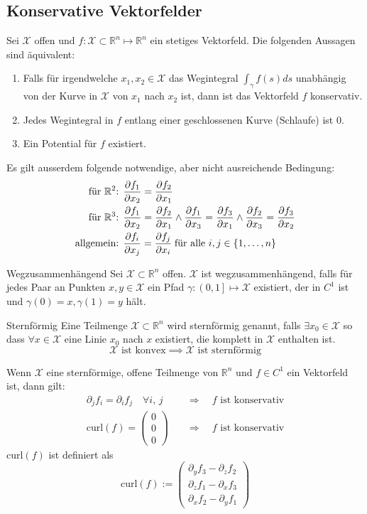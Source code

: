 \documentclass[a4paper,10pt]{article}
\def\R{\mathbb{R}}
\def\X{\mathcal{X}}
\begin{document}
\subsection{Konservative Vektorfelder}
Sei \(\X\) offen und \(f: \X \subset \R^n \mapsto \R^n\) ein stetiges Vektorfeld. Die folgenden Aussagen sind äquivalent:
\begin{enumerate}
  \item Falls für irgendwelche \(x_1, x_2 \in \X\) das Wegintegral \(\int_\gamma f(s) ds\) unabhängig von der Kurve in \(\X\) von \(x_1\) nach \(x_2\) ist, dann ist das Vektorfeld \(f\) konservativ.
  \item Jedes Wegintegral in \(f\) entlang einer geschlossenen Kurve (Schlaufe) ist 0.
  \item Ein Potential für \(f\) existiert.
\end{enumerate}
Es gilt ausserdem folgende notwendige, aber nicht ausreichende Bedingung:
\begin{align*}
  \text{für $\R^2$: }&\pdv{f_1}{x_2} = \pdv{f_2}{x_1}\\
  \text{für $\R^3$: }&\pdv{f_1}{x_2} = \pdv{f_2}{x_1} \land \pdv{f_1}{x_3} = \pdv{f_3}{x_1} \land \pdv{f_2}{x_3} = \pdv{f_3}{x_2}\\
  \text{allgemein: }&\pdv{f_i}{x_j} = \pdv{f_j}{x_i}\; \text{für alle $i,j \in \{1,\dots,n\}$}
\end{align*}
\begin{subbox}{Wegzusammenhängend}
  Sei \(\X \subset \R^n\) offen. \(\X\) ist wegzusammenhängend, falls für jedes Paar an Punkten \(x, y \in \X\) ein Pfad \(\gamma : \left(0,1\right] \mapsto \X\) existiert, der in \(C^1\) ist und \(\gamma(0) = x, \gamma(1) = y\) hält.
\end{subbox}

\begin{subbox}{Sternförmig}
  Eine Teilmenge \(\X \subset \R^n\) wird sternförmig genannt, falls \(\exists x_0 \in \X\) so dass \(\forall x \in \X\) eine Linie \(x_0\) nach \(x\) existiert, die komplett in \(\X\) enthalten ist. 
  \[\X \text{ ist konvex} \implies \X \text{ ist sternförmig}\]
\end{subbox}
Wenn \(\X\) eine sternförmige, offene Teilmenge von \(\R^n\) und \(f \in C^1\) ein Vektorfeld ist, dann gilt:
\begin{align*}
  \partial_j f_i = \partial_i f_j \quad \forall i,\, j
  \quad &\Rightarrow \quad \text{$f$ ist konservativ}\\
  \text{curl}(f) = \begin{pmatrix}
    0\\0\\0
  \end{pmatrix}
  \quad &\Rightarrow \quad \text{$f$ ist konservativ}
\end{align*}
\(\text{curl}(f)\) ist definiert als
\[\text{curl}(f) := \begin{pmatrix}
  \partial_y f_3 - \partial_z f_2 \\
  \partial_z f_1 - \partial_x f_3 \\
  \partial_x f_2 - \partial_y f_1
\end{pmatrix}\]
\end{document}
